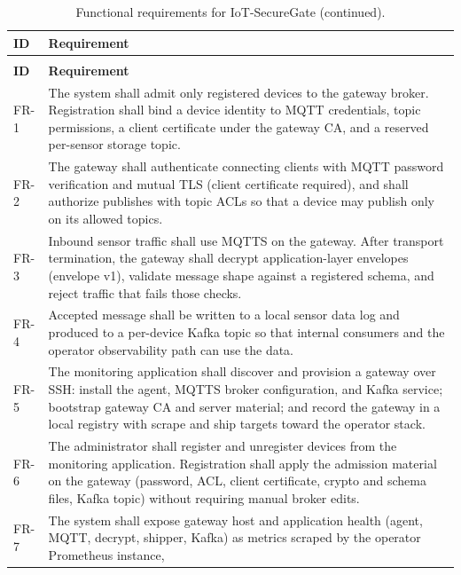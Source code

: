 \documentclass[12pt,a4paper]{report}
\begin{document}
\begin{longtable}{@{}p{1.6cm}p{\dimexpr\textwidth-1.6cm-4\tabcolsep\relax}@{}}
\caption{Functional requirements for IoT-SecureGate.}
\label{tab:functional-requirements}\\
\toprule
\textbf{ID} & \textbf{Requirement} \\
\midrule
\endfirsthead
\caption[]{Functional requirements for IoT-SecureGate
  (continued).}\\
\toprule
\textbf{ID} & \textbf{Requirement} \\
\midrule
\endhead
\bottomrule
\endlastfoot
FR-1
& The system shall admit only registered devices to the
  gateway broker. Registration shall bind a device
  identity to MQTT credentials, topic permissions, a
  client certificate under the gateway CA, and a
  reserved per-sensor storage topic. \\
\midrule
FR-2
& The gateway shall authenticate connecting clients with
  MQTT password verification and mutual TLS (client
  certificate required), and shall authorize publishes
  with topic ACLs so that a device may publish only on
  its allowed topics. \\
\midrule
FR-3
& Inbound sensor traffic shall use MQTTS on the gateway.
  After transport termination, the gateway shall decrypt
  application-layer envelopes (envelope v1), validate
  message shape against a registered schema, and reject
  traffic that fails those checks. \\
\midrule
FR-4
& Accepted message shall be written to a local sensor
  data log and produced to a per-device Kafka topic so
  that internal consumers and the operator observability
  path can use the data. \\
\midrule
FR-5
& The monitoring application shall discover and provision
  a gateway over SSH: install the agent, MQTTS broker
  configuration, and Kafka service; bootstrap gateway CA
  and server material; and record the gateway in a local
  registry with scrape and ship targets toward the
  operator stack. \\
\midrule
FR-6
& The administrator shall register and unregister devices
  from the monitoring application. Registration shall
  apply the admission material on the gateway (password,
  ACL, client certificate, crypto and schema files,
  Kafka topic) without requiring manual broker edits. \\
\midrule
FR-7
& The system shall expose gateway host and application
  health (agent, MQTT, decrypt, shipper, Kafka) as
  metrics scraped by the operator Prometheus instance,

\end{longtable}
\end{document}
